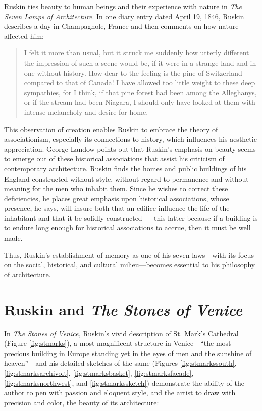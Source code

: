Ruskin ties beauty to human beings and their experience with nature in
\textit{The Seven Lamps of Architecture}.  In one diary entry dated
April 19, 1846, Ruskin describes a day in Champagnole, France and then
comments on how nature affected him: 

\begin{quote}
I felt it more than usual, but it struck me suddenly how utterly
different the impression of such a scene would be, if it were in a
strange land and in one without history.  How dear to the feeling is
the pine of Switzerland compared to that of Canada!  I have allowed too
little weight to these deep sympathies, for I think, if that pine
forest had been among the Alleghanys, or if the stream had been
Niagara, I should only have looked at them with intense melancholy and
desire for home.\citep[][pg. 325]{ruskin1956}
\end{quote}

This observation of creation enables Ruskin to embrace the theory of
associationism, especially its connections to history, which influences
his aesthetic appreciation.  George Landow points out that Ruskin’s
emphasis on beauty seems to emerge out of these historical associations
that assist his criticism of contemporary architecture.  Ruskin finds the homes and
public buildings of his England constructed without style, without
regard to permanence and without meaning for the men who inhabit them. 
Since he wishes to correct these deficiencies, he places great emphasis
upon historical associations, whose presence, he says, will insure both
that an edifice influence the life of the inhabitant and that it be
solidly constructed — this latter because if a building is to endure
long enough for historical associations to accrue, then it must be well
made. 

Thus, Ruskin’s establishment of memory as one of his seven laws—with its
focus on the social, historical, and cultural milieu—becomes essential
to his philosophy of architecture. 

\section{Ruskin and \textit{The Stones of Venice}}


In \textit{The Stones of Venice,} Ruskin’s vivid description of St.
Mark’s Cathedral (Figure \ref{fig:stmarks}), a most magnificent structure in Venice---“the
most precious building in Europe standing yet in the eyes of men and
the sunshine of heaven”\citep{nyt1880}---and his detailed sketches of the
same (Figures \ref{fig:stmarkssouth}, \ref{fig:stmarksarchivolt}, \ref{fig:stmarksbasket}, \ref{fig:stmarksfacade}, \ref{fig:stmarksnorthwest}, and \ref{fig:stmarkssketch}) demonstrate the ability of the author to pen with
passion and eloquent style, and the artist to draw with precision and
color, the beauty of its architecture: 


